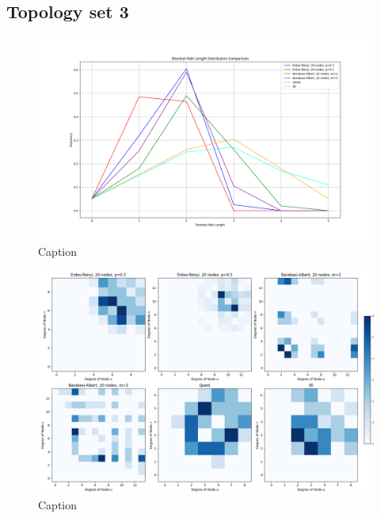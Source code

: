 \subsection{Topology set 3}
\begin{figure}
    \centering
    \includegraphics[width=0.9\linewidth]{images/FINAL-TOPO-COMP/line-20.png}
    \caption{Caption}
    \label{fig:enter-label}
\end{figure}

\begin{figure}
    \centering
    \includegraphics[width=0.9\linewidth]{images/FINAL-TOPO-COMP/Degree-correlation-matrices/20-matrix.png}
    \caption{Caption}
    \label{fig:enter-label}
\end{figure}

